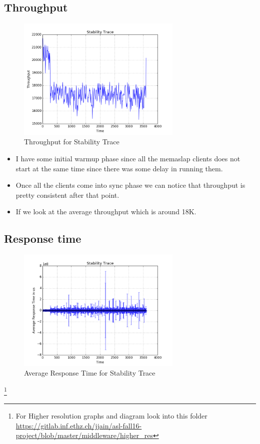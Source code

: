 \documentclass[11pt]{article}
\begin{document}
\subsection{Throughput}
\begin{figure}[h!]
    \centering
    \includegraphics[width=0.7\textwidth]{stab_throughput.png}
    \caption{Throughput for Stability Trace }
    \label{fig:hash}
\end{figure}
\begin{itemize}
	\item I have some initial warmup phase since all the memaslap clients does not start at the same time since there was some delay in running them.
	\item Once all the clients come into sync phase we can notice that throughput is pretty consistent after that point.
	\item If we look at the average throughput which is around 18K.
\end{itemize}

\subsection{Response time}
\begin{figure}[h!]
    \centering
    \includegraphics[width=0.7\textwidth]{stab_avg.png}
    \caption{Average Response Time for Stability Trace}
    \label{fig:hash}
\end{figure}
\footnote{For Higher resolution graphs and diagram look into this folder \url{https://gitlab.inf.ethz.ch/jjain/asl-fall16-project/blob/master/middleware/higher_res}}
\end{document}
